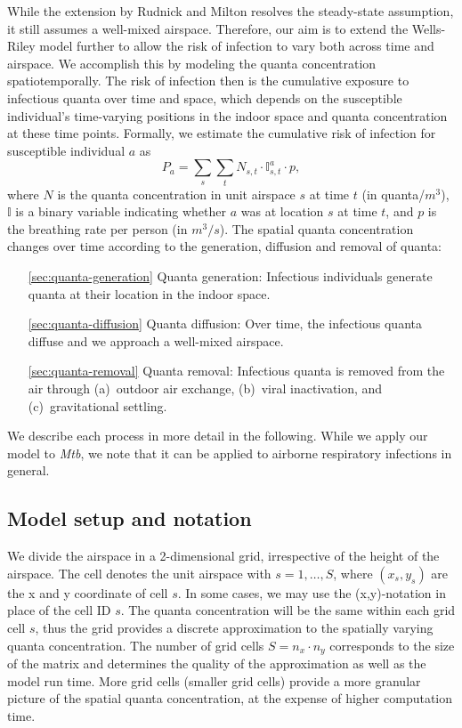 \documentclass[fleqn,11pt]{wlscirep_supp}
\begin{document}
While the extension by Rudnick and Milton resolves the steady-state assumption, it still assumes a well-mixed airspace. Therefore, our aim is to extend the Wells-Riley model further to allow the risk of infection to vary both across time and airspace. We accomplish this by modeling the quanta concentration spatiotemporally. The risk of infection then is the cumulative exposure to infectious quanta over time and space, which depends on the susceptible individual's time-varying positions in the indoor space and quanta concentration at these time points. Formally, we estimate the cumulative risk of infection for susceptible individual $a$ as 
\begin{equation}\label{eq:spattemp-P}
    P_a = \sum_s \sum_t N_{s,t} \cdot \mathbb{I}_{s,t}^a \cdot p,
\end{equation}
where $N$ is the quanta concentration in unit airspace $s$ at time $t$ (in quanta/$m^3$), $\mathbb{I}$ is a binary variable indicating whether $a$ was at location $s$ at time $t$, and $p$ is the breathing rate per person (in $m^3/s$). The spatial quanta concentration changes over time according to the generation, diffusion and removal of quanta: 
\begin{itemize}
    \item[\ref{sec:quanta-generation}] Quanta generation: Infectious individuals generate quanta at their location in the indoor space. 
    \item[\ref{sec:quanta-diffusion}] Quanta diffusion: Over time, the infectious quanta diffuse and we approach a well-mixed airspace. 
    \item[\ref{sec:quanta-removal}] Quanta removal: Infectious quanta is removed from the air through (a)~outdoor air exchange, (b)~viral inactivation, and (c)~gravitational settling. 
\end{itemize}
We describe each process in more detail in the following. While we apply our model to \emph{Mtb}, we note that it can be applied to airborne respiratory infections in general.

\subsection{Model setup and notation}

We divide the airspace in a 2-dimensional grid, irrespective of the height of the airspace. The cell denotes the unit airspace with $s = 1, \dots, S$, where $(x_s, y_s)$ are the x and y coordinate of cell $s$. In some cases, we may use the (x,y)-notation in place of the cell ID $s$. The quanta concentration will be the same within each grid cell $s$, thus the grid provides a discrete approximation to the spatially varying quanta concentration. The number of grid cells $S = n_x \cdot n_y$ corresponds to the size of the matrix and determines the quality of the approximation as well as the model run time. More grid cells (smaller grid cells) provide a more granular picture of the spatial quanta concentration, at the expense of higher computation time. 
\end{document}
